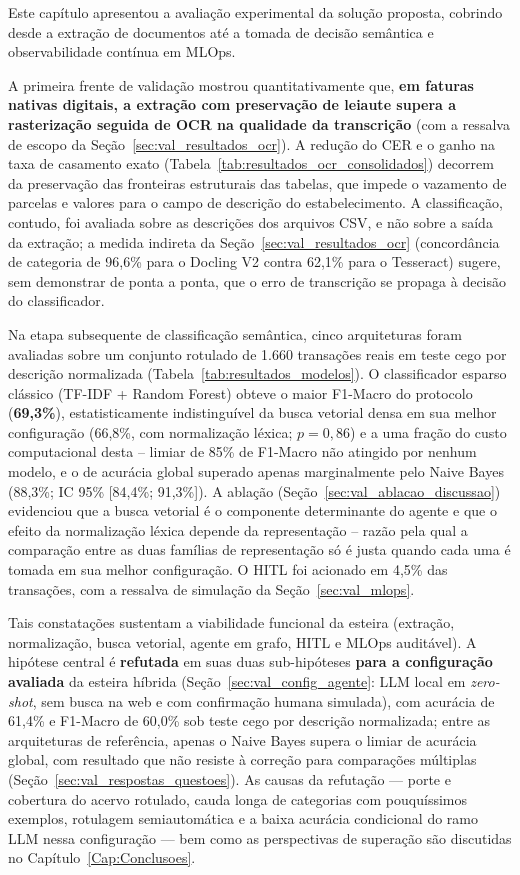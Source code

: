 Este capítulo apresentou a avaliação experimental da solução proposta, cobrindo desde a extração de documentos até a tomada de decisão semântica e observabilidade contínua em MLOps. 

A primeira frente de validação mostrou quantitativamente que, \textbf{em faturas nativas digitais, a extração com preservação de leiaute supera a rasterização seguida de OCR na qualidade da transcrição} (com a ressalva de escopo da Seção~\ref{sec:val_resultados_ocr}). A redução do CER e o ganho na taxa de casamento exato (Tabela~\ref{tab:resultados_ocr_consolidados}) decorrem da preservação das fronteiras estruturais das tabelas, que impede o vazamento de parcelas e valores para o campo de descrição do estabelecimento. A classificação, contudo, foi avaliada sobre as descrições dos arquivos CSV, e não sobre a saída da extração; a medida indireta da Seção~\ref{sec:val_resultados_ocr} (concordância de categoria de 96,6\% para o Docling V2 contra 62,1\% para o Tesseract) sugere, sem demonstrar de ponta a ponta, que o erro de transcrição se propaga à decisão do classificador.

Na etapa subsequente de classificação semântica, cinco arquiteturas foram avaliadas sobre um conjunto rotulado de 1.660 transações reais em teste cego por descrição normalizada (Tabela~\ref{tab:resultados_modelos}). O classificador esparso clássico (TF-IDF + Random Forest) obteve o maior F1-Macro do protocolo (\textbf{69,3\%}), estatisticamente indistinguível da busca vetorial densa em sua melhor configuração (66,8\%, com normalização léxica; $p = 0{,}86$) e a uma fração do custo computacional desta -- limiar de 85\% de F1-Macro não atingido por nenhum modelo, e o de acurácia global superado apenas marginalmente pelo Naive Bayes (88,3\%; IC 95\% [84,4\%; 91,3\%]). A ablação (Seção~\ref{sec:val_ablacao_discussao}) evidenciou que a busca vetorial é o componente determinante do agente e que o efeito da normalização léxica depende da representação -- razão pela qual a comparação entre as duas famílias de representação só é justa quando cada uma é tomada em sua melhor configuração. O HITL foi acionado em 4,5\% das transações, com a ressalva de simulação da Seção~\ref{sec:val_mlops}.

Tais constatações sustentam a viabilidade funcional da esteira (extração, normalização, busca vetorial, agente em grafo, HITL e MLOps auditável). A hipótese central é \textbf{refutada} em suas duas sub-hipóteses \textbf{para a configuração avaliada} da esteira híbrida (Seção~\ref{sec:val_config_agente}: LLM local em \textit{zero-shot}, sem busca na web e com confirmação humana simulada), com acurácia de 61,4\% e F1-Macro de 60,0\% sob teste cego por descrição normalizada; entre as arquiteturas de referência, apenas o Naive Bayes supera o limiar de acurácia global, com resultado que não resiste à correção para comparações múltiplas (Seção~\ref{sec:val_respostas_questoes}). As causas da refutação --- porte e cobertura do acervo rotulado, cauda longa de categorias com pouquíssimos exemplos, rotulagem semiautomática e a baixa acurácia condicional do ramo LLM nessa configuração --- bem como as perspectivas de superação são discutidas no Capítulo~\ref{Cap:Conclusoes}.
